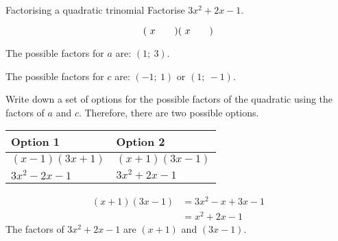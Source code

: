 \begin{wex}
{ 
Factorising a quadratic trinomial 
}
{
Factorise $3{x}^{2}+2x-1$. 
} 
{
\begin{equation*}
(\ x\phantom{\rule{2.em}{0ex}})(\ x\phantom{\rule{2.em}{0ex}})
\end{equation*}

The possible factors for $a$ are: $(1;~3)$.\par
The possible factors for $c$ are: $(-1;~1)$ or $(1;~-1)$.\par 
Write down a set of options for the possible factors of the quadratic using the factors of $a$ and $c$.
Therefore, there are two possible options.\par 

\begin{table}[H]
\begin{center}
\label{m39394*id277097}
\noindent

\begin{tabular}{|l|l|}\hline
\textbf{Option 1} &
\textbf{Option 2}%
\\ \hline
$(x-1)(3x+1)$
&
$(x+1)(3x-1)$
\\ \hline
$3{x}^{2}-2x-1$
&
\uline{
$3{x}^{2}+2x-1$
}
\\ \hline
\end{tabular}
\end{center}
\end{table}

\begin{align*}
  (x+1)(3x-1) &= 3{x}^{2}-x+3x-1 \\
  &= {x}^{2}+2x-1
\end{align*}
The factors of $3{x}^{2}+2x-1$ are $(x+1)$ and $(3x-1)$.
}
\end{wex}


